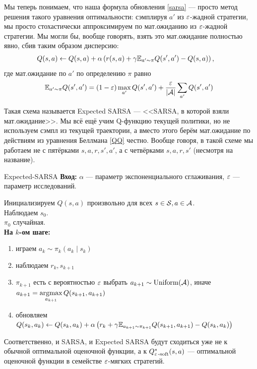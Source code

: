 Мы теперь понимаем, что наша формула обновления \eqref{sarsa} --- просто метод решения такого уравнения оптимальности: сэмплируя $a'$ из $\varepsilon$-жадной стратегии, мы просто стохастически аппроксимируем по мат.ожиданию из $\varepsilon$-жадной стратегии. Мы могли бы, вообще говорять, взять это мат.ожидание полностью явно, сбив таким образом дисперсию:
\begin{align*}\label{expectedsarsa}
Q(s, a) &\leftarrow Q(s, a) + \alpha \left( r(s, a) + \gamma \mathbb{E}_{a' \sim \pi} Q(s', a') - Q(s, a) \right),
\end{align*}
где мат.ожидание по $a'$ по определению $\pi$ равно
$$\mathbb{E}_{a' \sim \pi} Q(s', a') = (1 - \varepsilon) \max_{a'} Q(s', a') + \frac{\varepsilon}{|\mathcal{A}|} \sum_{a'} Q(s', a')$$

Такая схема называется Expected SARSA --- <<SARSA, в которой взяли мат.ожидание>>. Мы всё ещё учим Q-функцию текущей политики, но не используем сэмпл из текущей траектории, а вместо этого берём мат.ожидание по действиям из уравнения Беллмана \eqref{QQ} честно. Вообще говоря, в такой схеме мы работаем не с пятёрками $s, a, r, s', a'$, а с четвёрками $s, a, r, s'$ (несмотря на название).

\begin{algorithm}{Expected-SARSA}
\textbf{Вход:} $\alpha$ --- параметр экспоненциального сглаживания, $\varepsilon$ --- параметр исследований.

\vspace{0.3cm}
Инициализируем $Q(s, a)$ произвольно для всех $s \in \mathcal{S}, a \in \mathcal{A}$. \\
Наблюдаем $s_0$. \\
$\pi_0$ случайная. \\
\textbf{На $k$-ом шаге:}
\begin{enumerate}
    \item играем $a_k \sim \pi_k(a_k \mid s_k)$
    \item наблюдаем $r_k, s_{k+1}$
    \item $\pi_{k+1}$ есть с вероятностью $\varepsilon$ выбрать $a_{k+1} \sim \operatorname{Uniform}(\mathcal{A})$, иначе $a_{k+1} = \mathop{\mathrm{argmax}}\limits_{a_{k+1}} Q(s_{k+1}, a_{k+1})$
    \item обновляем $Q(s_k, a_k) \leftarrow Q(s_k, a_k) + \alpha \left( r_k + \gamma \mathbb{E}_{a_{k+1} \sim \pi_{k+1}}Q(s_{k+1}, a_{k+1}) - Q(s_k, a_k) \right)$
\end{enumerate}
\end{algorithm}

Соответственно, и SARSA, и Expected SARSA будут сходиться уже не к обычной оптимальной оценочной функции, а к $Q^*_{\varepsilon\operatorname{-soft}}(s, a)$ --- оптимальной оценочной функции в семействе $\varepsilon$-мягких стратегий.

